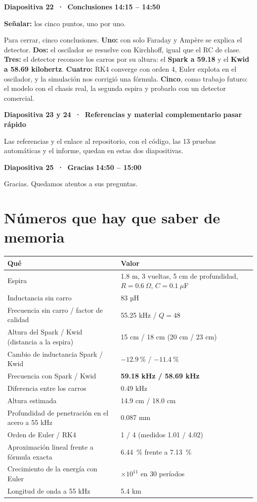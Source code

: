 \documentclass[11pt,a4paper]{article}
\newcommand{\diapo}[3]{%
  \par\vspace{8pt}
  {\large\bfseries Diapositiva #1 \,·\, #2}\hfill{\normalsize\bfseries\color{AzulIcesi} #3}\par
  \vspace{1pt}}
\newcommand{\senala}[1]{{\small\color{AzulIcesi}\textbf{Señalar:} #1}\par}
\begin{document}
\diapo{22}{Conclusiones}{14:15 -- 14:50}
\senala{los cinco puntos, uno por uno.}

Para cerrar, cinco conclusiones. \textbf{Uno:} con solo Faraday y Ampère se explica el detector. \textbf{Dos:} el
oscilador se resuelve con Kirchhoff, igual que el RC de clase. \textbf{Tres:} el detector reconoce los carros por su
altura: el \textbf{Spark a 59.18} y el \textbf{Kwid a 58.69 kilohertz}. \textbf{Cuatro:} RK4 converge con orden 4,
Euler explota en el oscilador, y la simulación nos corrigió una fórmula. \textbf{Cinco}, como trabajo futuro: el
modelo con el chasis real, la segunda espira y probarlo con un detector comercial.

\diapo{23 y 24}{Referencias y material complementario}{pasar rápido}

Las referencias y el enlace al repositorio, con el código, las 13 pruebas automáticas y el informe, quedan en estas
dos diapositivas.

\diapo{25}{Gracias}{14:50 -- 15:00}

Gracias. Quedamos atentos a sus preguntas.

\clearpage
\section*{Números que hay que saber de memoria}

\begin{center}
\small\begin{tabular}{@{}p{8.2cm}p{7.8cm}@{}}
\toprule
Qué & Valor \\
\midrule
Espira & 1.8 m, 3 vueltas, 5 cm de profundidad, $R = 0.6~\Omega$, $C = 0.1~\mu$F \\
Inductancia sin carro & 83 µH \\
Frecuencia sin carro / factor de calidad & 55.25 kHz / $Q = 48$ \\
Altura del Spark / Kwid (distancia a la espira) & 15 cm / 18 cm (20 cm / 23 cm) \\
Cambio de inductancia Spark / Kwid & $-12.9~\%$ / $-11.4~\%$ \\
Frecuencia con Spark / Kwid & \textbf{59.18 kHz / 58.69 kHz} \\
Diferencia entre los carros & 0.49 kHz \\
Altura estimada & 14.9 cm / 18.0 cm \\
Profundidad de penetración en el acero a 55 kHz & 0.087 mm \\
Orden de Euler / RK4 & 1 / 4 (medidos 1.01 / 4.02) \\
Aproximación lineal frente a fórmula exacta & 6.44~\% frente a 7.13~\% \\
Crecimiento de la energía con Euler & $\times 10^{11}$ en 30 períodos \\
Longitud de onda a 55 kHz & 5.4 km \\
\bottomrule
\end{tabular}
\end{center}
\end{document}
